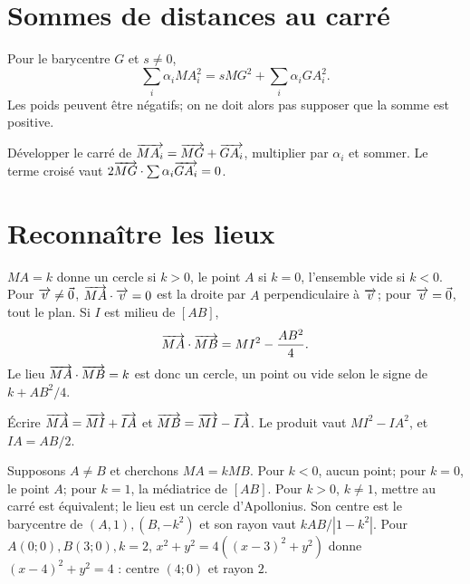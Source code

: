 \section{Sommes de distances au carré}
\begin{propriete}Pour le barycentre $G$ et $s\ne0$,
\[
\sum_i\alpha_i MA_i^2=sMG^2+\sum_i\alpha_i GA_i^2.
\]
Les poids peuvent être négatifs; on ne doit alors pas supposer que la somme est positive.
\end{propriete}
\begin{demonstration}Développer le carré de $\overrightarrow{MA_i}=\overrightarrow{MG}+\overrightarrow{GA_i}$, multiplier par $\alpha_i$ et sommer. Le terme croisé vaut $2\overrightarrow{MG}\cdot\sum\alpha_i\overrightarrow{GA_i}=0$.\end{demonstration}
\section{Reconnaître les lieux}
\begin{propriete}
$MA=k$ donne un cercle si $k>0$, le point $A$ si $k=0$, l’ensemble vide si $k<0$.
Pour $\overrightarrow{v}\ne\vec0$, $\overrightarrow{MA}\cdot\overrightarrow{v}=0$ est la droite par $A$ perpendiculaire à $\overrightarrow{v}$; pour $\overrightarrow{v}=\vec0$, tout le plan.
Si $I$ est milieu de $[AB]$,
\[
\overrightarrow{MA}\cdot\overrightarrow{MB}=MI^2-\frac{AB^2}{4}.
\]
Le lieu $\overrightarrow{MA}\cdot\overrightarrow{MB}=k$ est donc un cercle, un point ou vide selon le signe de $k+AB^2/4$.
\end{propriete}
\begin{demonstration}Écrire $\overrightarrow{MA}=\overrightarrow{MI}+\overrightarrow{IA}$ et $\overrightarrow{MB}=\overrightarrow{MI}-\overrightarrow{IA}$. Le produit vaut $MI^2-IA^2$, et $IA=AB/2$.\end{demonstration}
\begin{exemple}
Supposons $A\ne B$ et cherchons $MA=kMB$. Pour $k<0$, aucun point; pour $k=0$, le point $A$; pour $k=1$, la médiatrice de $[AB]$. Pour $k>0$, $k\ne1$, mettre au carré est équivalent; le lieu est un cercle d’Apollonius. Son centre est le barycentre de $(A,1),(B,-k^2)$ et son rayon vaut $kAB/|1-k^2|$.
Pour $A(0;0),B(3;0),k=2$, $x^2+y^2=4((x-3)^2+y^2)$ donne $(x-4)^2+y^2=4$ : centre $(4;0)$ et rayon $2$.
\end{exemple}


